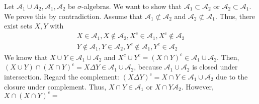 \documentclass[a4paper]{article}
\begin{document}
Let $\mathcal A_1 \cup A_2, \mathcal A_1, \mathcal A_2$ be $\sigma$-algebras. We want to show that $\mathcal A_1 \subset \mathcal A_2$ or $\mathcal A_2 \subset \mathcal A_1$. We prove this by contradiction. Assume that $\mathcal A_1 \not \subset \mathcal A_2$ and $\mathcal A_2 \not \subset \mathcal A_1$. Thus, there exist sets $X,Y$ with
\begin{gather*}
	X \in \mathcal A_1, X \notin \mathcal A_2, X^c \in \mathcal A_1, X^c \notin \mathcal A_2 \\
	Y \notin \mathcal A_1, Y \in \mathcal A_2, Y^c \notin \mathcal A_1, Y^c \in \mathcal A_2 
\end{gather*}
We know that $X \cup Y \in \mathcal A_1 \cup \mathcal A_2$ and $X^c \cup Y^c = (X \cap Y)^c \in \mathcal A_1 \cup \mathcal A_2$. Then, $(X \cup Y) \cap (X \cap Y)^c = X \Delta Y \in \mathcal A_1 \cup \mathcal A_2$, because $\mathcal A_1 \cup \mathcal A_2$ is closed under  intersection. Regard the complement: $(X \Delta Y)^c = X \cap Y \in \mathcal A_1 \cup \mathcal A_2$ due to the closure under complement. Thus, $X \cap Y \in \mathcal A_1$ or $X \cap Y \mathcal A_2$. However, $X \cap (X \cap Y)^c = $ 
\fi 
\end{document}
